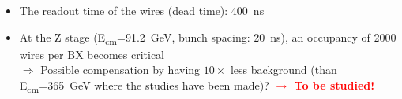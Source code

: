 \documentclass[aspectratio=169, hyperref={colorlinks=true,pdfpagelabels=false,linkcolor=black}, xcolor=dvipsnames,10pt]{beamer}
\begin{document}
\begin{frame}
\begin{columns}[t]
	\end{columns}

        \vspace{-0.2cm}
	\begin{itemize}
	\item The readout time of the wires (dead time): 400~ns
        \item At the Z stage (E\textsubscript{cm}=91.2~GeV, bunch
          spacing: 20~ns), an occupancy of 2000 wires per BX
          becomes critical \\
          $\Rightarrow$ Possible compensation by having $10\times$
          less background (than E\textsubscript{cm}=365~GeV where the
          studies have been made)?  \textbf{\textcolor{red}{$\rightarrow$ To be
            studied!}}
	\end{itemize}
	
\end{frame}
\end{document}
